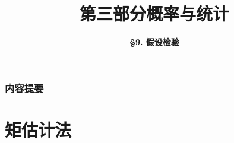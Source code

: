 

\usepackage{tabu}


\title[Probability \& Statistics]{\LARGE \bfseries 第三部分\quad 概率与统计} %
\author[Hypothesis Test] %
{\Large \bfseries \S 9. 假设检验}
\date{}






\begin{frame}

\titlepage %

\end{frame}


\begin{frame}

\end{frame}


\begin{frame}
\frametitle{内容提要} %
\tableofcontents %
\end{frame}


\section{矩估计法}

